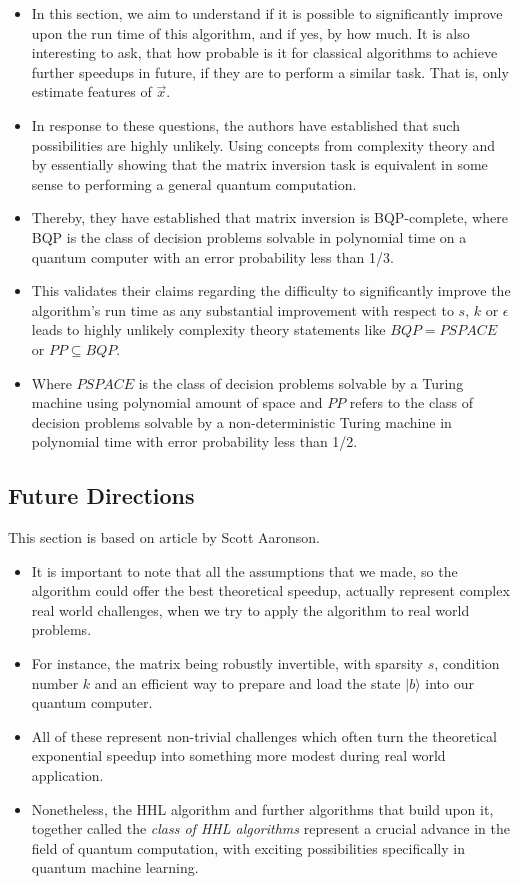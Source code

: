 \documentclass[12pt]{article}
\begin{document}
\begin{itemize}
    \item In this section, we aim to understand if it is possible to significantly improve upon the run time of this algorithm, and if yes, by how much. It is also interesting to ask, that how probable is it for classical algorithms to achieve further speedups in future, if they are to perform a similar task. That is, only estimate features of $\vec x$.
    \item In response to these questions, the authors have established that such possibilities are highly unlikely. Using concepts from complexity theory and by essentially showing that the matrix inversion task is equivalent in some sense to performing a general quantum computation.
    \item Thereby, they have established that matrix inversion is BQP-complete, where BQP is the class of decision problems solvable in polynomial time on a quantum computer with an error probability less than 1/3.
    \item This validates their claims regarding the difficulty to significantly improve the algorithm's run time as any substantial improvement with respect to $s$, $k$ or $\epsilon$ leads to highly unlikely complexity theory statements like $BQP = PSPACE$ or $PP \subseteq BQP$.
    \item Where $PSPACE$ is the class of decision problems solvable by a Turing machine using polynomial amount of space and $PP$ refers to the class of decision problems solvable by a non-deterministic Turing machine in polynomial time with error probability less than 1/2.
\end{itemize}

\subsection{Future Directions}
This section is based on article\cite{QML} by Scott Aaronson.
\begin{itemize}
    \item It is important to note that all the assumptions that we made, so the algorithm could offer the best theoretical speedup, actually represent complex real world challenges, when we try to apply the algorithm to real world problems.
    \item For instance, the matrix being robustly invertible, with sparsity $s$, condition number $k$ and an efficient way to prepare and load the state $|b\rangle$ into our quantum computer.
    \item All of these represent non-trivial challenges which often turn the theoretical exponential speedup into something more modest during real world application.
    \item Nonetheless, the HHL algorithm and further algorithms that build upon it, together called the \emph{class of HHL algorithms} represent a crucial advance in the field of quantum computation, with exciting possibilities specifically in quantum machine learning.
\end{itemize}

\printbibliography
\end{document}
